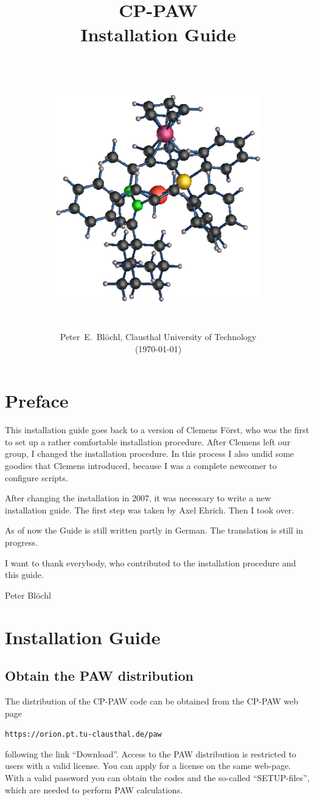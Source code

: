 \documentclass[a4paper,10pt]{report}
\title{{\bfseries\Huge
\hrulefill\\
\hrulefill CP-PAW\hrulefill\\
\hrulefill Installation Guide\hrulefill\\
\hrulefill\\}
\hfill\\
\includegraphics[width=9cm]{Figs/big.eps}
}
\date{\hrulefill\\Peter~E.~Bl\"ochl, Clausthal University of Technology\\(\today)}
\newcommand{\mytt}[1]{{\tt #1}}
\begin{document}
\maketitle
\tableofcontents

\chapter{Preface}
This installation guide goes back to a version of Clemens F\"orst, who
was the first to set up a rather comfortable installation procedure.
After Clemens left our group, I changed the installation procedure. In
this process I also undid some goodies that Clemens introduced,
because I was a complete newcomer to configure scripts.

After changing the installation in 2007, it was necessary to write a
new installation guide. The first step was taken by Axel Ehrich. Then
I took over.

As of now the Guide is still written partly in German. The translation
is still in progress.

I want to thank everybody, who contributed to the installation
procedure and this guide.

Peter Bl\"ochl

\chapter{Installation Guide}
\label{sec:vollstinst}

\section{Obtain the PAW distribution}
The distribution of the CP-PAW code can be obtained from the CP-PAW
web page
\begin{center}
\mytt{https://orion.pt.tu-clausthal.de/paw}
\end{center}
following the link ``Download''. Access to the PAW distribution is
restricted to users with a valid license. You can apply for a license
on the same web-page. With a valid password you can obtain the codes
and the so-called ``SETUP-files'', which are needed
to perform PAW calculations.
\end{document}
